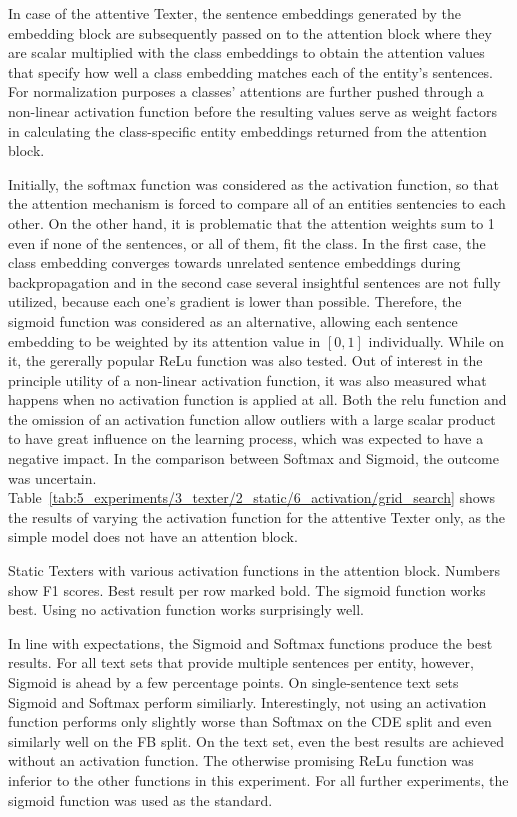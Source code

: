 In case of the attentive Texter, the sentence embeddings generated by the embedding block are subsequently passed on to the attention block where they are scalar multiplied with the class embeddings to obtain the attention values that specify how well a class embedding matches each of the entity's sentences. For normalization purposes a classes' attentions are further pushed through a non-linear activation function before the resulting values serve as weight factors in calculating the class-specific entity embeddings returned from the attention block.

Initially, the softmax function was considered as the activation function, so that the attention mechanism is forced to compare all of an entities sentencies to each other. On the other hand, it is problematic that the attention weights sum to 1 even if none of the sentences, or all of them, fit the class. In the first case, the class embedding converges towards unrelated sentence embeddings during backpropagation and in the second case several insightful sentences are not fully utilized, because each one's gradient is lower than possible. Therefore, the sigmoid function was considered as an alternative, allowing each sentence embedding to be weighted by its attention value in $[0, 1]$ individually. While on it, the gererally popular ReLu function was also tested. Out of interest in the principle utility of a non-linear activation function, it was also measured what happens when no activation function is applied at all. Both the relu function and the omission of an activation function allow outliers with a large scalar product to have great influence on the learning process, which was expected to have a negative impact. In the comparison between Softmax and Sigmoid, the outcome was uncertain. Table~\ref{tab:5_experiments/3_texter/2_static/6_activation/grid_search} shows the results of varying the activation function for the attentive Texter only, as the simple model does not have an attention block.

\begin{table}[t]
    \centering
    
    \caption{Static Texters with various activation functions in the attention block. Numbers show F1 scores. Best result per row marked bold. The sigmoid function works best. Using no activation function works surprisingly well.}
    \label{tab:5_experiments/3_texter/2_static/6_activation/grid_search}
\end{table}

In line with expectations, the Sigmoid and Softmax functions produce the best results. For all text sets that provide multiple sentences per entity, however, Sigmoid is ahead by a few percentage points. On single-sentence text sets Sigmoid and Softmax perform similiarly. Interestingly, not using an activation function performs only slightly worse than Softmax on the CDE split and even similarly well on the FB split. On the text set, even the best results are achieved without an activation function. The otherwise promising ReLu function was inferior to the other functions in this experiment. For all further experiments, the sigmoid function was used as the standard.
